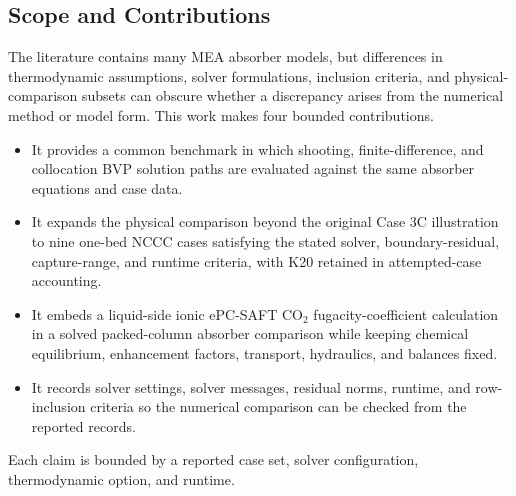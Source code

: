     \subsection{Scope and Contributions}
        The literature contains many MEA absorber models, but differences in thermodynamic assumptions, solver formulations, inclusion criteria, and physical-comparison subsets can obscure whether a discrepancy arises from the numerical method or model form. This work makes four bounded contributions.
        \begin{itemize}
            \item It provides a common benchmark in which shooting, finite-difference, and collocation BVP solution paths are evaluated against the same absorber equations and case data.
            \item It expands the physical comparison beyond the original Case 3C illustration to nine one-bed NCCC cases satisfying the stated solver, boundary-residual, capture-range, and runtime criteria, with K20 retained in attempted-case accounting.
            \item It embeds a liquid-side ionic ePC-SAFT CO$_2$ fugacity-coefficient calculation in a solved packed-column absorber comparison while keeping chemical equilibrium, enhancement factors, transport, hydraulics, and balances fixed.
            \item It records solver settings, solver messages, residual norms, runtime, and row-inclusion criteria so the numerical comparison can be checked from the reported records.
        \end{itemize}
        Each claim is bounded by a reported case set, solver configuration, thermodynamic option, and runtime.
